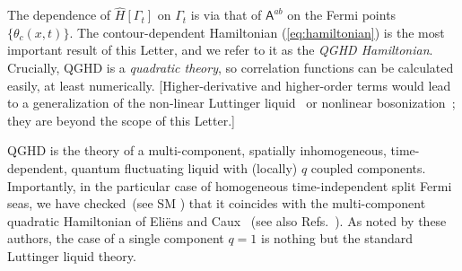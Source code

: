 \documentclass[twocolumn,amsfonts,showpacs,superscriptaddress]{revtex4-1}
\begin{document}
The dependence of $\hat H[\Gamma_t]$ on $\Gamma_t$ is via that of $\mathsf A^{ab}$ on the Fermi points $\{\theta_c(x,t)\}$. The contour-dependent Hamiltonian (\ref{eq:hamiltonian}) is the most important result of this Letter, and we refer to it as the {\it QGHD Hamiltonian}. Crucially, QGHD is a {\it quadratic theory}, so correlation functions can be calculated easily, at least numerically. [Higher-derivative and higher-order terms would lead to a generalization of the non-linear Luttinger liquid~\cite{imambekov2012one,imambekov2009universal} or nonlinear bosonization~\cite{abanov2005quantum,bettelheim2008quantum,stone2008classical,kulkarni2009nonlinear}; they are beyond the scope of this Letter.]

QGHD is the theory of a multi-component, spatially inhomogeneous, time-dependent, quantum fluctuating liquid with (locally) $q$ coupled components. Importantly, in the particular case of homogeneous time-independent split Fermi seas, we have checked~(see SM \cite{SM}) that it coincides with the multi-component quadratic Hamiltonian of Eli\"ens and Caux~\cite{eliens2016general,eliens2017quantum} (see also Refs.~\cite{fokkema2014split,vlijm2016correlations}). As noted by these authors, the case of a single component $q=1$ is nothing but the standard Luttinger liquid theory.
\end{document}
